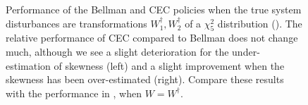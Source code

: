 \documentclass[main.tex]{subfiles}
\begin{document}
\begin{figure}[htbp]
\begin{subfigure}[b]{0.5\textwidth}
  \end{subfigure}
  \caption{Performance of the Bellman  and CEC policies when the true system disturbances
    are transformations $W_1^\dagger,W_2^\dagger$ of
    a $\chi_5^2$ distribution ().
    The relative performance of CEC compared to Bellman does not
    change much,
    although we see a slight deterioration for the under-estimation of
    skewness (left) and a slight improvement when the skewness has
    been over-estimated (right).
    Compare these results with the performance in
    , when $W=W^\dagger$.
  }\label{fig:markdown_bellman_mpc_chi2}
\end{figure}

\biblio
\end{document}
